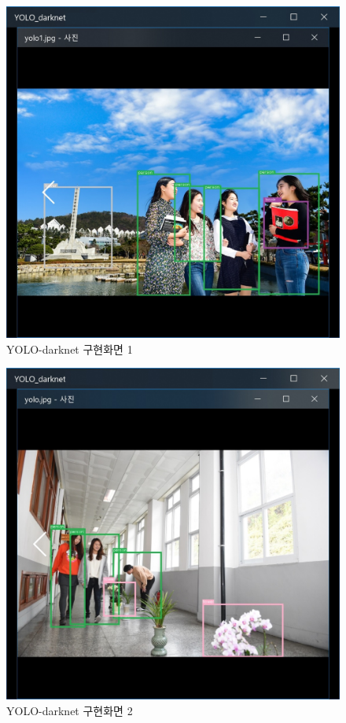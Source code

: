 \documentclass{article}
\begin{document}
\begin{figure}[h!]
\centering
\includegraphics[scale=0.4]
{how/YOLO_darknet_1.jpg}
\caption{YOLO-darknet 구현화면 1}
\label{fig:detect}
\end{figure}

\begin{figure}[h!]
\centering
\includegraphics[scale=0.4]
{how/YOLO_darknet_.jpg}
\caption{YOLO-darknet 구현화면 2}
\label{fig:detect}
\end{figure}
\end{document}
